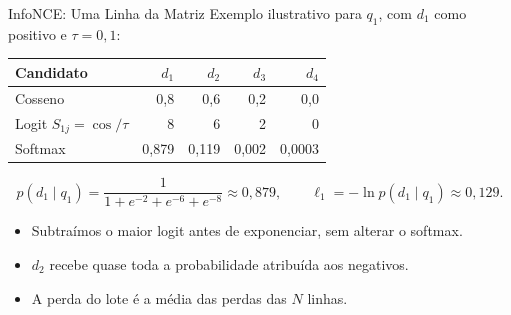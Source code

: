 \documentclass[aspectratio=169, xcolor=dvipsnames]{beamer}
\begin{document}
  \begin{frame}{InfoNCE: Uma Linha da Matriz}
    Exemplo ilustrativo para $q_1$, com $d_1$ como positivo e $\tau=0{,}1$:
    \begin{center}
      \begin{tabular}{lrrrr}
        \toprule
        Candidato & $d_1$ & $d_2$ & $d_3$ & $d_4$\\
        \midrule
        Cosseno & 0,8 & 0,6 & 0,2 & 0,0\\
        Logit $S_{1j}=\cos/\tau$ & 8 & 6 & 2 & 0\\
        Softmax & 0,879 & 0,119 & 0,002 & 0,0003\\
        \bottomrule
      \end{tabular}
    \end{center}
    \[
      p(d_1\mid q_1)=\frac{1}{1+e^{-2}+e^{-6}+e^{-8}}\approx0{,}879,
      \qquad \ell_1=-\ln p(d_1\mid q_1)\approx0{,}129.
    \]
    \begin{itemize}
      \item Subtraímos o maior logit antes de exponenciar, sem alterar o softmax.
      \item $d_2$ recebe quase toda a probabilidade atribuída aos negativos.
      \item A perda do lote é a média das perdas das $N$ linhas.
    \end{itemize}
  \end{frame}
\end{document}
